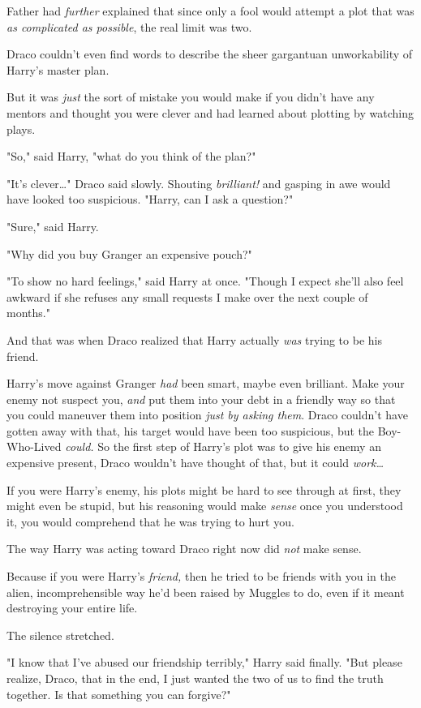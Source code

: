 Father had \emph{further} explained that since only a fool would attempt a plot 
that was \emph{as complicated as possible}, the real limit was two.

Draco couldn't even find words to describe the sheer gargantuan unworkability 
of Harry's master plan.

But it was \emph{just} the sort of mistake you would make if you didn't have 
any mentors and thought you were clever and had learned about plotting by 
watching plays.

"So," said Harry, "what do you think of the plan?"

"It's clever{\ldots}" Draco said slowly. Shouting \emph{brilliant!} and gasping 
in awe would have looked too suspicious. "Harry, can I ask a question?"

"Sure," said Harry.

"Why did you buy Granger an expensive pouch?"

"To show no hard feelings," said Harry at once. "Though I expect she'll also 
feel awkward if she refuses any small requests I make over the next couple of 
months."

And that was when Draco realized that Harry actually \emph{was} trying to be 
his friend.

Harry's move against Granger \emph{had} been smart, maybe even brilliant. Make 
your enemy not suspect you, \emph{and} put them into your debt in a friendly 
way so that you could maneuver them into position \emph{just by asking them}. 
Draco couldn't have gotten away with that, his target would have been too 
suspicious, but the Boy-Who-Lived \emph{could.} So the first step of Harry's 
plot was to give his enemy an expensive present, Draco wouldn't have thought of 
that, but it could \emph{work{\ldots}}

If you were Harry's enemy, his plots might be hard to see through at first, 
they might even be stupid, but his reasoning would make \emph{sense} once you 
understood it, you would comprehend that he was trying to hurt you.

The way Harry was acting toward Draco right now did \emph{not} make sense.

Because if you were Harry's \emph{friend,} then he tried to be friends with you 
in the alien, incomprehensible way he'd been raised by Muggles to do, even if 
it meant destroying your entire life.

The silence stretched.

"I know that I've abused our friendship terribly," Harry said finally. "But 
please realize, Draco, that in the end, I just wanted the two of us to find the 
truth together. Is that something you can forgive?"

